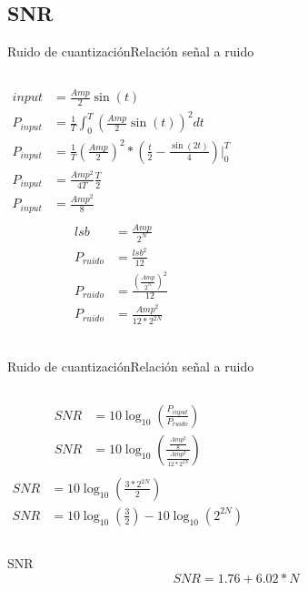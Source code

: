  \subsection{SNR}
 \begin{frame}{Ruido de cuantización}{Relación señal a ruido}
    \begin{columns}[onlytextwidth]
       \begin{align*}
          input&=\frac{Amp}{2}\sin(t) \\
          P_{input} &= \frac{1}{T} \int^T_0 \left(\frac{Amp}{2}\sin(t)\right)^2 dt \\
          P_{input} &= \frac{1}{T} \left(\frac{Amp}{2}\right)^2* \left( \frac{t}{2}-\frac{\sin(2t)}{4}\right)\Big\rvert^T_0 \\
          P_{input} &= \frac{Amp^2}{4T} \frac{T}{2}\\
          P_{input} &= \frac{Amp^2}{8} \\
       \end{align*}
       \begin{align*}
          lsb       &= \frac{Amp}{2^N} \\
          P_{ruido} &= \frac{lsb^2}{12}\\
          P_{ruido} &= \frac{\left(\frac{Amp}{2^N}\right)^2}{12}\\
          P_{ruido} &= \frac{Amp^2}{12*2^{2N}}\\
       \end{align*}
    \end{columns}
    \vfill
 \end{frame}
 \begin{frame}{Ruido de cuantización}{Relación señal a ruido}
    \begin{columns}[onlytextwidth]
       \begin{align*}
          SNR&=10 \log_{10} \left(\frac{P_{input}}{P_{ruido}} \right)\\
          SNR&=10 \log_{10}\left(\frac{\frac{Amp^2}{8}}{\frac{Amp^2}{12*2^{2N}}} \right) \\
       \end{align*}
       \begin{align*}
          SNR&=10 \log_{10}\left(\frac{3*2^{2N}}{2} \right)\\
          SNR&=10\log_{10}\left(\frac{3}{2}\right)-10\log_{10}\left(2^{2N}\right)
       \end{align*}
    \end{columns}
    \begin{block}{SNR}
       \begin{equation}
          SNR = 1.76 + 6.02 * N
       \end{equation}
    \end{block}
    \begin{centering}
        \\
        \\
    \end{centering}
 \end{frame}
